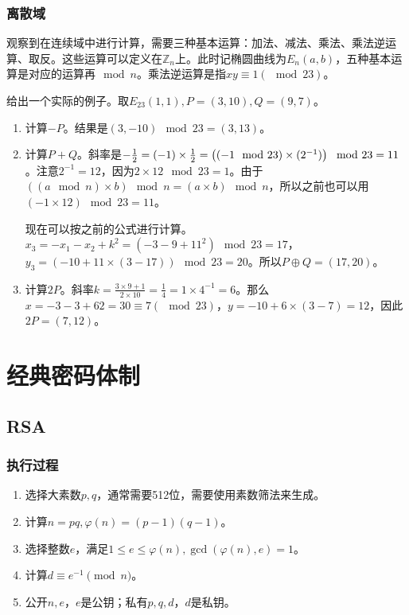 \subsubsection{离散域}
观察到在连续域中进行计算，需要三种基本运算：加法、减法、乘法、乘法逆运算、取反。这些运算可以定义在$\mathbb{Z}_n$上。此时记椭圆曲线为$E_n(a,b)$，五种基本运算是对应的运算再$\mod n$。乘法逆运算是指$xy\equiv 1 (\mod 23)$。

给出一个实际的例子。取$E_{23}(1,1),P=(3,10),Q=(9,7)$。
\begin{enumerate}
\item 计算$-P$。结果是$(3,-10) \mod 23=(3, 13)$。
\item 计算$P+Q$。斜率是$-\frac{1}{2}=(-1)\times \frac{1}{2}=\left((-1 \mod 23) \times (2^{-1}) \right)\mod 23=11$。注意$2^{-1}=12$，因为$2\times 12 \mod 23=1$。由于$\left((a\mod n)\times b\right)\mod n=(a\times b)\mod n$，所以之前也可以用$(-1\times 12)\mod 23=11$。

现在可以按之前的公式进行计算。$x_3=-x_1-x_2+k^2=(-3-9+11^2)\mod 23=17$，$y_3=(-10+11\times (3-17))\mod 23=20$。所以$P\oplus Q=(17,20)$。
\item 计算$2P$。斜率$k=\frac{3\times 9+1}{2\times 10}=\frac{1}{4}=1\times 4^{-1}=6$。那么$x=-3-3+62=30\equiv 7(\mod 23)$，$y=-10+6\times(3-7)=12$，因此$2P=(7,12)$。
\end{enumerate}

\section{经典密码体制}
\subsection{RSA}
\subsubsection{执行过程}
\begin{enumerate}
\item 选择大素数$p,q$，通常需要512位，需要使用素数筛法来生成。
\item 计算$n=pq, \varphi(n)=(p-1)(q-1)$。
\item 选择整数$e$，满足$1\leq e\leq \varphi(n),\gcd(\varphi(n),e)=1$。
\item 计算$d\equiv e^{-1}\pmod{n}$。
\item 公开$n,e$，$e$是公钥；私有$p,q,d$，$d$是私钥。
\end{enumerate}

